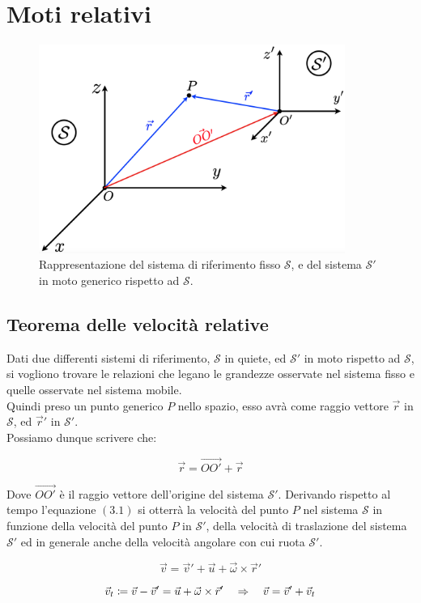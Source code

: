 \chapter{Moti relativi}
\begin{figure}[htbp]
\begin{center}
\includegraphics[width=10cm]{images/motirelativi.png}
\caption{Rappresentazione del sistema di riferimento fisso $\mathcal{S}$, e del sistema  $\mathcal{S'}$ in moto generico rispetto ad  $\mathcal{S}$.}
\label{default}
\end{center}
\end{figure}

\section{Teorema delle velocità relative}

Dati due differenti sistemi di riferimento,  $\mathcal{S}$ in quiete, ed  $\mathcal{S'}$ in moto rispetto ad  $\mathcal{S}$, si vogliono trovare le relazioni che legano le grandezze osservate nel sistema fisso e quelle osservate nel sistema mobile.\\
Quindi preso un punto generico $P$ nello spazio, esso avrà come raggio vettore $\vec r$ in  $\mathcal{S}$, ed $\vec r'$ in  $\mathcal{S'}$.
\\Possiamo dunque scrivere che:

\begin{equation}
\vec r = \vec{OO'}+\vec r
\end{equation}

Dove $\vec{OO'}$ è il raggio vettore dell'origine del sistema $\mathcal{S'}$. Derivando rispetto al tempo l'equazione $(3.1)$ si otterrà la velocità del punto $P$ nel sistema $\mathcal{S}$ in funzione della velocità del punto $P$ in $\mathcal{S'}$, della velocità di traslazione del sistema $\mathcal{S'}$ ed in generale anche della velocità angolare con cui ruota $\mathcal{S'}$.

\begin{equation}
\boxed{\vec v = \vec v' + \vec u + \vec \omega\times\vec r'}
\end{equation}

\begin{equation}
\vec v_t \coloneqq \vec v - \vec v' = \vec u + \vec \omega\times\vec r'\quad\Rightarrow\quad \vec v = \vec v' + \vec v_t
\end{equation}
